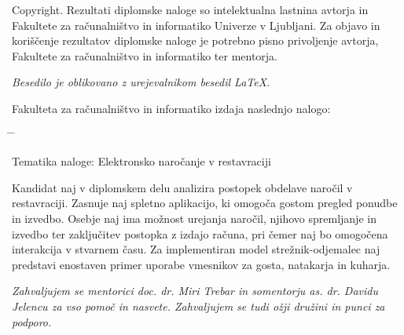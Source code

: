 \documentclass[a4paper, 12pt]{book}
\newcommand{\clearemptydoublepage}{\newpage{\pagestyle{empty}\cleardoublepage}}
\begin{document}
\noindent
{\sc Copyright}. 
Rezultati diplomske naloge so intelektualna lastnina avtorja in Fakultete za računalništvo in informatiko Univerze v Ljubljani.
Za objavo in koriščenje rezultatov diplomske naloge je potrebno pisno privoljenje avtorja, Fakultete za računalništvo in informatiko ter mentorja.

\begin{center}
\mbox{}\vfill
\emph{Besedilo je oblikovano z urejevalnikom besedil \LaTeX.}
\end{center}
\clearemptydoublepage

\thispagestyle{empty}
\vspace*{4cm}

\noindent
Fakulteta za računalništvo in informatiko izdaja naslednjo nalogo:
\medskip
\begin{tabbing}
\hspace{32mm}\= \hspace{6cm} \= \kill




Tematika naloge: Elektronsko naročanje v restavraciji
\end{tabbing}
Kandidat naj v diplomskem delu analizira postopek obdelave naročil v restavraciji. Zasnuje naj spletno aplikacijo, ki omogoča gostom pregled ponudbe in izvedbo. Osebje naj ima možnost urejanja naročil, njihovo spremljanje in izvedbo ter zaključitev postopka z izdajo računa, pri čemer naj bo omogočena interakcija v stvarnem času. Za implementiran model strežnik-odjemalec naj predstavi enostaven primer uporabe vmesnikov za gosta, natakarja in kuharja.
\vspace{15mm}




\vspace{2cm}

\clearemptydoublepage

\thispagestyle{empty}\mbox{}\vfill\null\it%
\noindent
Zahvaljujem se mentorici doc. dr. Miri Trebar in somentorju as. dr. Davidu Jelencu za vso pomoč in nasvete.
Zahvaljujem se tudi ožji družini in punci za podporo.
\rm\normalfont

\clearemptydoublepage

\end{document}
